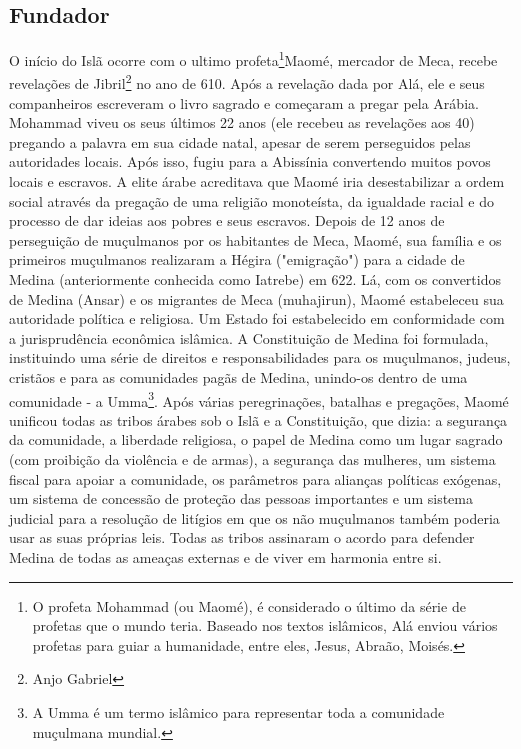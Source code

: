 \documentclass[12pt]{article}
\begin{document}
\subsection{Fundador}
O início do Islã ocorre com o ultimo profeta\footnote{
    O profeta Mohammad (ou Maomé), é considerado o último da série de profetas que o mundo teria.
    Baseado nos textos islâmicos, Alá enviou vários profetas para guiar a humanidade, entre eles, Jesus, Abraão, Moisés.
}Maomé, mercador de Meca, recebe revelações de Jibril\footnote{Anjo Gabriel} no ano de 610.
Após a revelação dada por Alá, ele e seus companheiros escreveram o livro sagrado e começaram a pregar pela Arábia.
Mohammad viveu os seus últimos 22 anos (ele recebeu as revelações aos 40) pregando a palavra em sua cidade natal, apesar de serem perseguidos pelas autoridades locais.
Após isso, fugiu para a Abissínia convertendo muitos povos locais e escravos.
A elite árabe acreditava que Maomé iria desestabilizar a ordem social através da pregação de uma religião monoteísta, da igualdade racial e do processo de dar ideias aos pobres e seus escravos. 
Depois de 12 anos de perseguição de muçulmanos por os habitantes de Meca, Maomé, sua família e os primeiros muçulmanos realizaram a Hégira ("emigração") para a cidade de Medina (anteriormente conhecida como Iatrebe) em 622.
Lá, com os convertidos de Medina (Ansar) e os migrantes de Meca (muhajirun), Maomé estabeleceu sua autoridade política e religiosa.
Um Estado foi estabelecido em conformidade com a jurisprudência econômica islâmica.
A Constituição de Medina foi formulada, instituindo uma série de direitos e responsabilidades para os muçulmanos, judeus, cristãos e para as comunidades pagãs de Medina, unindo-os dentro de uma comunidade - a Umma\footnote{A Umma é um termo islâmico para representar toda a comunidade muçulmana mundial.}.
Após várias peregrinações, batalhas e pregações, Maomé unificou todas as tribos árabes sob o Islã e a Constituição, que dizia:
a segurança da comunidade, a liberdade religiosa, o papel de Medina como um lugar sagrado (com proibição da violência e de armas), a segurança das mulheres, um sistema fiscal para apoiar a comunidade, os parâmetros para alianças políticas exógenas, um sistema de concessão de proteção das pessoas importantes e um sistema judicial para a resolução de litígios em que os não muçulmanos também poderia usar as suas próprias leis. Todas as tribos assinaram o acordo para defender Medina de todas as ameaças externas e de viver em harmonia entre si.
\end{document}
